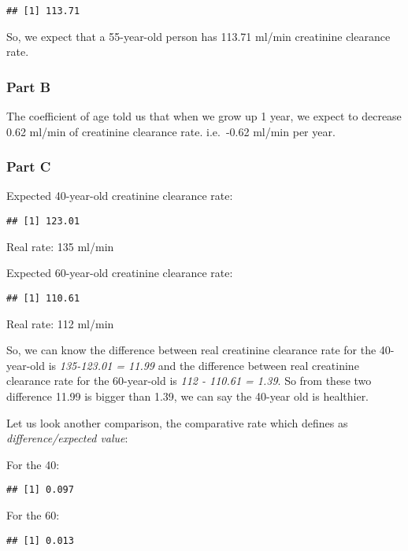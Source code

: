 \documentclass[
]{article}
\begin{document}
\begin{verbatim}
## [1] 113.71
\end{verbatim}

So, we expect that a 55-year-old person has 113.71 ml/min creatinine clearance rate.

\hypertarget{part-b-4}{%
\subsubsection{Part B}\label{part-b-4}}

The coefficient of age told us that when we grow up 1 year, we expect to decrease 0.62 ml/min of creatinine clearance rate. i.e.~-0.62 ml/min per year.

\hypertarget{part-c-2}{%
\subsubsection{Part C}\label{part-c-2}}

Expected 40-year-old creatinine clearance rate:

\begin{verbatim}
## [1] 123.01
\end{verbatim}

Real rate: 135 ml/min

Expected 60-year-old creatinine clearance rate:

\begin{verbatim}
## [1] 110.61
\end{verbatim}

Real rate: 112 ml/min

So, we can know the difference between real creatinine clearance rate for the 40-year-old is \emph{135-123.01 = 11.99} and the difference between real creatinine clearance rate for the 60-year-old is \emph{112 - 110.61 = 1.39}. So from these two difference 11.99 is bigger than 1.39, we can say the 40-year old is healthier.

Let us look another comparison, the comparative rate which defines as \emph{difference/expected value}:

For the 40:

\begin{verbatim}
## [1] 0.097
\end{verbatim}

For the 60:

\begin{verbatim}
## [1] 0.013
\end{verbatim}
\end{document}
